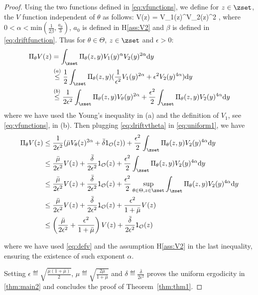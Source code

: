 \documentclass[10pt,twocolumn,letterpaper]{article}
\begin{document}
\begin{proof}
Using the two functions defined in \eqref{eq:vfunctions}, we define for $z \in \zset$, the $V$ function independent of $\theta$ as follows:
\beq\label{eq:defv}
V(z) = V_1(z)^\alpha V_2(z)^{2\alpha} \eqsp,
\eeq
where $0 < \alpha < \textrm{min}(\frac{1}{2\beta},\frac{a_0}{3})$, $a_0$ is defined in H\ref{ass:V2} and $\beta$ is defined in \eqref{eq:driftfunction}.
Thus for $\theta \in \Theta$, $z \in \zset$ and $\epsilon >0$:
\begin{align}\notag
\Pi_\theta V(z) & = \int_{\zset} \Pi_\theta(z,y) V_1(y)^\alpha V_2(y)^{2\alpha} \textrm{d}y\\ \notag
& \overset{(a)}{\leq} \frac{1}{2} \int_{\zset} \Pi_\theta(z,y) (\frac{1}{\epsilon^2}V_1(y)^{2\alpha} + \epsilon^2 V_2(y)^{4\alpha}) \textrm{d}y\\ 
& \overset{(b)}{\leq} \frac{1}{2\epsilon^2} \int_{\zset} \Pi_\theta(z,y) V_\theta(y)^{2\alpha} + \frac{\epsilon^2}{2}  \int_{\zset} \Pi_\theta(z,y)  V_2(y)^{4\alpha} \textrm{d}y \label{eq:uniform1}
\end{align}
where we have used the Young's inequality in (a) and the definition of $V_1$, see \eqref{eq:vfunctions}, in (b).
Then plugging \eqref{eq:driftvtheta} in \eqref{eq:uniform1}, we have
\begin{align}
\Pi_\theta V(z) & \leq \frac{1}{2\epsilon^2} (\bar{\mu} V_\theta(z)^{2\alpha} + \bar{\delta} \mathsf{1}_{\mathcal{O}}(z) ) + \frac{\epsilon^2}{2}  \int_{\zset} \Pi_\theta(z,y)  V_2(y)^{4\alpha} \textrm{d}y\\
& \leq \frac{\bar{\mu}}{2 \epsilon^2} V(z) +\frac{\bar{\delta}}{2 \epsilon^2} \mathsf{1}_{\mathcal{O}}(z)  + \frac{\epsilon^2}{2}  \int_{\zset} \Pi_\theta(z,y)  V_2(y)^{4\alpha} \textrm{d}y\\
& \leq \frac{\bar{\mu}}{2 \epsilon^2} V(z) +\frac{\bar{\delta}}{2 \epsilon^2} \mathsf{1}_{\mathcal{O}}(z)  + \frac{\epsilon^2}{2} \sup \limits_{\theta \in \Theta, z \in \zset} \int_{\zset} \Pi_\theta(z,y)  V_2(y)^{4\alpha} \textrm{d}y\\
& \leq \frac{\bar{\mu}}{2 \epsilon^2} V(z) +\frac{\bar{\delta}}{2 \epsilon^2} \mathsf{1}_{\mathcal{O}}(z)  + \frac{\epsilon^2}{1 + \bar{\mu}}V(z)\\
& \leq \left(\frac{\bar{\mu}}{2 \epsilon^2} + \frac{\epsilon^2}{1 + \bar{\mu}} \right) V(z) +\frac{\bar{\delta}}{2 \epsilon^2} \mathsf{1}_{\mathcal{O}}(z) 
\end{align}

where we have used \eqref{eq:defv} and the assumption H\ref{ass:V2} in the last inequality, ensuring the existence of such exponent $\alpha$.

Setting $\epsilon \eqdef \sqrt{\frac{\bar{\mu}(1+\bar{\mu})}{2}}$, $ \mu  \eqdef  \sqrt{\frac{2\bar{\mu}}{1+\bar{\mu}}}$ and $\delta \eqdef \frac{\bar{\delta}}{2 \epsilon^2}$ proves the uniform ergodicity in \eqref{thm:main2} and concludes the proof of Theorem~\ref{thm:thm1}.
\end{proof}
\end{document}
